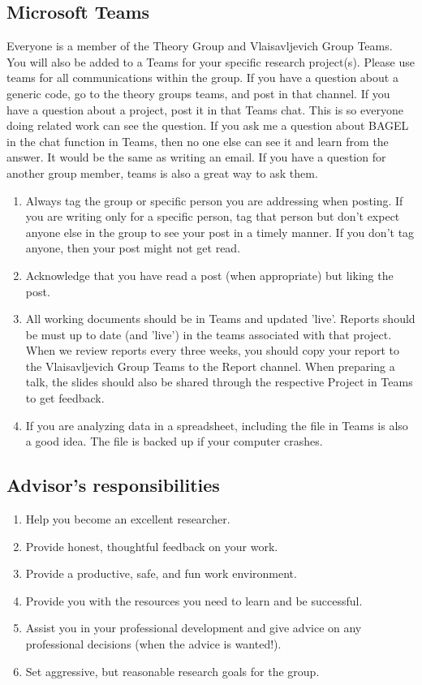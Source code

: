 \documentclass[letterpaper]{article}
\begin{document}
\subsection{Microsoft Teams}
Everyone is a member of the Theory Group and Vlaisavljevich Group Teams. You will also be added to a Teams for your specific research project(s). Please use teams for all communications within the group. If you have a question about a generic code, go to the theory groups teams, and post in that channel. If you have a question about a project, post it in that Teams chat. This is so everyone doing related work can see the question. If you ask me a question about BAGEL in the chat function in Teams, then no one else can see it and learn from the answer. It would be the same as writing an email. If you have a question for another group member, teams is also a great way to ask them.  
\begin{enumerate}
\item Always tag the group or specific person you are addressing when posting. If you are writing only for a specific person, tag that person but don't expect anyone else in the group to see your post in a timely manner. If you don't tag anyone, then your post might not get read.
\item Acknowledge that you have read a post (when appropriate) but liking the post. 
\item All working documents should be in Teams and updated 'live'.  Reports should be must up to date (and 'live') in the teams associated with that project. When we review reports every three weeks, you should copy your report to the Vlaisavljevich Group Teams to the Report channel. When preparing a talk, the slides should also be shared through the respective Project in Teams to get feedback. 
\item If you are analyzing data in a spreadsheet, including the file in Teams is also a good idea. The file is backed up if your computer crashes.  
\end{enumerate}

\subsection{Advisor's responsibilities}

\begin{enumerate}
\item Help you become an excellent researcher.
\item Provide honest, thoughtful feedback on your work.
\item Provide a productive, safe, and fun work environment.
\item Provide you with the resources you need to learn and be successful.
\item Assist you in your professional development and give advice on any professional decisions (when the advice is wanted!).
\item Set aggressive, but reasonable research goals for the group.
\end{enumerate}
\end{document}
